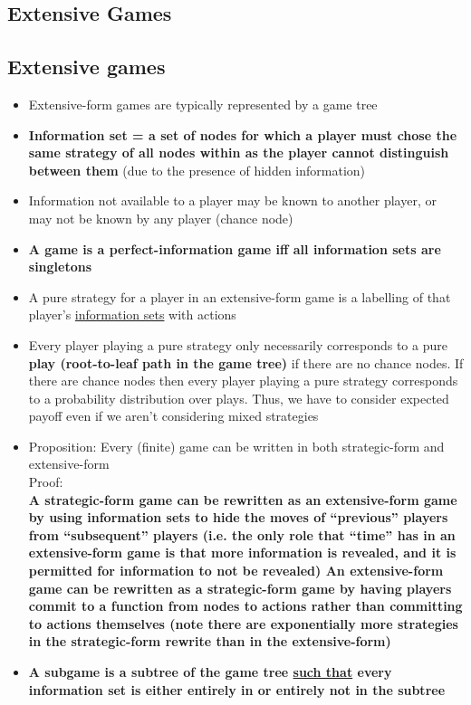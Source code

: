 \documentclass[20pt,a4paper,landscape]{extarticle}
\begin{document}
\begin{flushleft}
\section{Extensive Games}
\subsection{Extensive games}
\begin{itemize}
\item Extensive-form games are typically represented by a game tree
\item \textbf{Information set = a set of nodes for which a player must chose the same strategy of all nodes within as the player cannot distinguish between them} (due to the presence of hidden information)
\item Information not available to a player may be known to another player, or may not be known by any player (chance node)
\item \textbf{A game is a perfect-information game iff all information sets are singletons}
\item A pure strategy for a player in an extensive-form game is a labelling of that player's \underline{information sets} with actions
\item Every player playing a pure strategy only necessarily corresponds to a pure \textbf{play (root-to-leaf path in the game tree)} if there are no chance nodes. If there are chance nodes then every player playing a pure strategy corresponds to a probability distribution over plays. Thus, we have to consider expected payoff even if we aren't considering mixed strategies
\item Proposition: Every (finite) game can be written in both strategic-form and extensive-form\\
Proof:\\
\textbf{A strategic-form game can be rewritten as an extensive-form game by using information sets to hide the moves of ``previous'' players from ``subsequent'' players (i.e. the only role that ``time'' has in an extensive-form game is that more information is revealed, and it is permitted for information to not be revealed)\clearpage
An extensive-form game can be rewritten as a strategic-form game by having players commit to a function from nodes to actions rather than committing to actions themselves (note there are exponentially more strategies in the strategic-form rewrite than in the extensive-form)}
\item \textbf{A subgame is a subtree of the game tree \underline{such that} every information set is either entirely in or entirely not in the subtree}

\end{itemize}
\end{flushleft}
\end{document}
